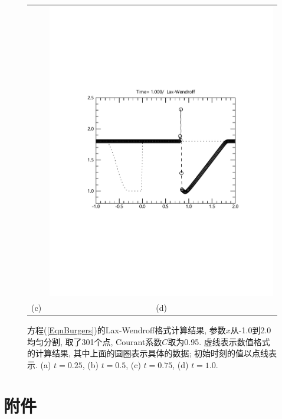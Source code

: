 \documentclass[10.5pt
]{article}
\begin{document}
\begin{figure}[htb]
\begin{center}
\begin{tabular}{cc}
			&
			\includegraphics[width=.45\textwidth]{fig2_2_4}
			\\[-10pt]
			(c) & (d)
		\end{tabular}
	\end{center}
	\caption{%
		方程(\ref{EqnBurgers})的Lax-Wendroff格式计算结果, 参数$x$从-1.0到2.0均匀分割, 取了301个点, Courant系数$C$取为0.95. 虚线表示数值格式的计算结果, 其中上面的圆圈表示具体的数据; 初始时刻的值以点线表示. (a) $t=0.25$, (b) $t=0.5$, (c) $t=0.75$, (d) $t=1.0$.}
	\label{BurgersL}
\end{figure}

\section*{附件}
\end{document}
